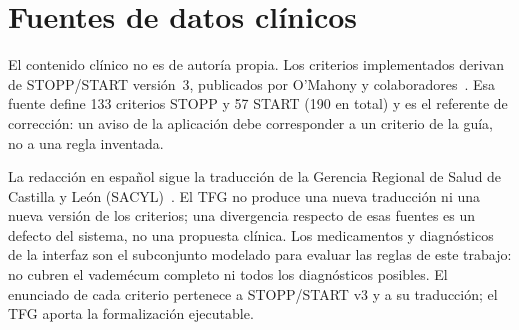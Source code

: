 \section{Fuentes de datos clínicos}
\label{sec:fuente-clinica}

El contenido clínico no es de autoría propia. Los criterios implementados
derivan de STOPP/START versión~3, publicados por O'Mahony y
colaboradores~\cite{omahony2023stopp}. Esa fuente define 133 criterios STOPP
y 57 START (190 en total) y es el referente de corrección: un aviso de la
aplicación debe corresponder a un criterio de la guía, no a una regla
inventada.

La redacción en español sigue la traducción de la Gerencia Regional de
Salud de Castilla y León (SACYL)~\cite{sacyl2023stopp}. El TFG no produce
una nueva traducción ni una nueva versión de los criterios; una divergencia
respecto de esas fuentes es un defecto del sistema, no una propuesta
clínica. Los medicamentos y diagnósticos de la interfaz son el subconjunto
modelado para evaluar las reglas de este trabajo: no cubren el vademécum
completo ni todos los diagnósticos posibles. El enunciado de cada criterio
pertenece a STOPP/START v3 y a su traducción; el TFG aporta la
formalización ejecutable.
